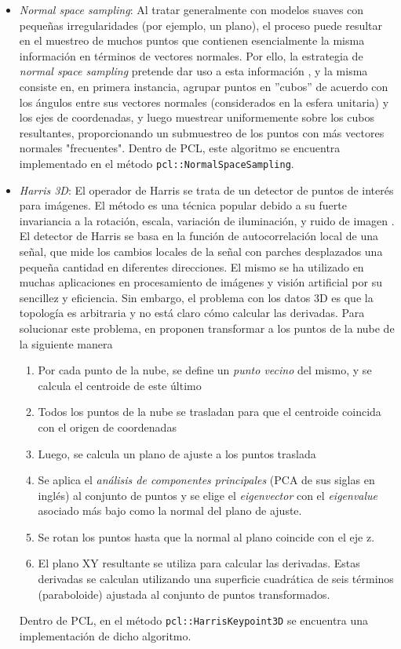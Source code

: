 \begin{itemize}
    \item \textit{Normal space sampling}: Al tratar generalmente con modelos suaves con pequeñas irregularidades (por ejemplo, un plano), el proceso puede resultar en el muestreo de muchos puntos que contienen esencialmente la misma información en términos de vectores normales. Por ello, la estrategia de \textit{normal space sampling} pretende dar uso a esta información \cite{rusinkiewicz2001}, y la misma consiste en, en primera instancia, agrupar puntos en ''cubos'' de acuerdo con los ángulos entre sus vectores normales (considerados en la esfera unitaria) y los ejes de coordenadas, y luego muestrear uniformemente sobre los cubos resultantes, proporcionando un submuestreo de los puntos con más vectores normales "frecuentes". Dentro de PCL, este algoritmo se encuentra implementado en el método \lstinline{pcl::NormalSpaceSampling}.
    \item \textit{Harris 3D}: El operador de Harris \cite{harris1988} se trata de un detector de puntos de interés para imágenes. El método es una técnica popular debido a su fuerte invariancia a la rotación, escala, variación de iluminación, y ruido de imagen \cite{schmid2000}. El detector de Harris se basa en la función de autocorrelación local de una señal, que mide los cambios locales de la señal con parches desplazados una pequeña cantidad en diferentes direcciones. El mismo se ha utilizado en muchas aplicaciones en procesamiento de imágenes y visión artificial por su sencillez y eficiencia. Sin embargo, el problema con los datos 3D es que la topología es arbitraria y no está claro cómo calcular las derivadas. Para solucionar este problema, en \cite{sipiran2011} proponen transformar a los puntos de la nube de la siguiente manera
    \begin{enumerate}
        \item Por cada punto de la nube, se define un \textit{punto vecino} del mismo, y se calcula el centroide de este último
        \item Todos los puntos de la nube se trasladan para que el centroide coincida con el origen de coordenadas
        \item Luego, se calcula un plano de ajuste a los puntos traslada
        \item Se aplica el \textit{análisis de componentes principales} (PCA de sus siglas en inglés) \cite{jollife2016} al conjunto de puntos y se elige el \textit{eigenvector} con el \textit{eigenvalue} asociado más bajo como la normal del plano de ajuste.
        \item Se rotan los puntos hasta que la normal al plano coincide con el eje z.
        \item El plano XY resultante se utiliza para calcular las derivadas. Estas derivadas se calculan utilizando una superficie cuadrática de seis términos (paraboloide) ajustada al conjunto de puntos transformados.
    \end{enumerate}
    Dentro de PCL, en el método \lstinline{pcl::HarrisKeypoint3D} se encuentra una implementación de dicho algoritmo.
\end{itemize}

